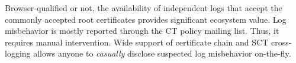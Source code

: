 Browser-qualified or not, the availability of independent logs that accept the
commonly accepted root certificates provides significant ecosystem value.
Log misbehavior is mostly reported through the CT policy mailing list.  Thus, it
requires manual intervention.  Wide support of certificate chain and SCT
cross-logging allows anyone to \emph{casually} disclose suspected log
misbehavior on-the-fly.




